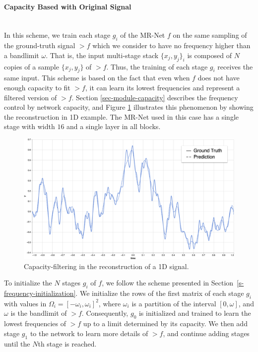 \paragraph{Capacity Based with Original Signal}~\\
In this scheme, we train each stage $g_i$ of the MR-Net $f$ on the same sampling of the ground-truth signal $\gt{f}$ which we consider to have
no frequency higher than a bandlimit $\omega$.  That is, the input multi-stage stack $\{x_j, y_j\}_i$ is composed of $N$ copies of a sample $\{x_j, y_j\}$ of $\gt{f}$. Thus, the training of each stage $g_i$ receives the same input. This scheme is based on the fact that even when $f$ does not have enough capacity to fit $\gt{f}$, it can learn its lowest frequencies and represent a filtered version of $\gt{f}$. Section \ref{sec-module-capacity} describes the frequency control by network capacity, and Figure \ref{f:capacity-filtering} illustrates this phenomenon by showing the reconstruction in 1D example. The MR-Net used in this case has a single stage with width $16$ and a single layer in all blocks.
\begin{figure}[!h]
\centering
\includegraphics[width=\linewidth]{img/ch4/capacity-filtering.png}
\caption{Capacity-filtering in the reconstruction of a 1D signal.}
\label{f:capacity-filtering}
\end{figure}

To initialize the $N$ stages ${g_i}$ of $f$, we follow the scheme presented in Section~\ref{s-frequency-initialization}. We initialize the rows of the first matrix of each stage $g_i$ with values in $\Omega_i=[-\omega_i, \omega_i]^2$, where ${\omega_i}$ is a partition of the interval $[0,\omega]$, and $\omega$ is the bandlimit of $\gt{f}$. Consequently, $g_0$ is initialized and trained to learn the lowest frequencies of $\gt{f}$ up to a limit determined by its capacity. We then add stage $g_1$ to the network to learn more details of $\gt{f}$, and continue adding stages until the $N$th stage is reached. 

